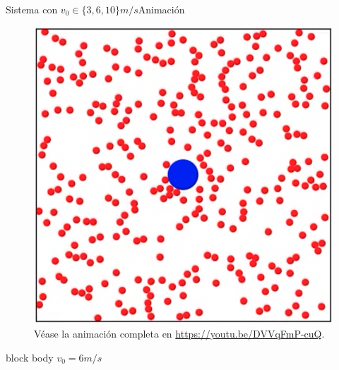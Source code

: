 \documentclass{beamer}
\begin{document}
\begin{frame}{Sistema con $v_0 \in \{ 3, 6, 10\}m/s$}{Animación}
\begin{minipage}[t]{0.30\textwidth}
\begin{figure}[H!]
                        \includegraphics[width=\textwidth]{./animation_obstacle_still_v_6}
                        \caption*{Véase la animación completa en \url{https://youtu.be/DVVqFmP-cuQ}.}
                        \label{fig:a_3}
                    \end{figure}
                    \begin{beamercolorbox}[sep=5pt,center]{block body}
                        \centering
                        \small{$v_0=6m/s$}
                    \end{beamercolorbox}
                \end{minipage}
                \hfill
                \begin{minipage}[t]{0.30\textwidth}
                    \begin{figure}[H!]

\end{figure}
\end{minipage}
\end{frame}
\end{document}
